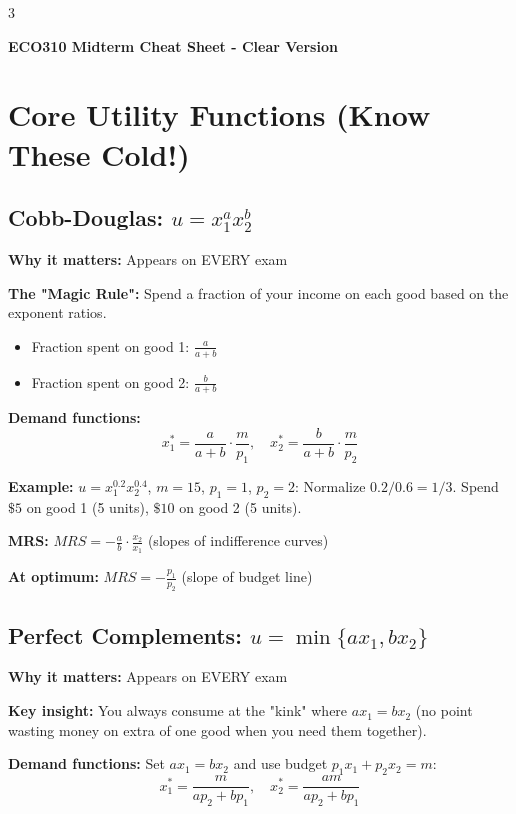 \documentclass[10pt,landscape]{article}
\begin{document}
\begin{multicols}{3}
\small

\begin{center}
\textbf{\large ECO310 Midterm Cheat Sheet - Clear Version}
\end{center}

\section{Core Utility Functions (Know These Cold!)}

\subsection{Cobb-Douglas: $u = x_1^a x_2^b$}
\textbf{Why it matters:} Appears on EVERY exam

\textbf{The "Magic Rule":} Spend a fraction of your income on each good based on the exponent ratios.
\begin{itemize}[leftmargin=*,noitemsep,topsep=0pt]
\item Fraction spent on good 1: $\frac{a}{a+b}$
\item Fraction spent on good 2: $\frac{b}{a+b}$
\end{itemize}

\textbf{Demand functions:}
$$x_1^* = \frac{a}{a+b} \cdot \frac{m}{p_1}, \quad x_2^* = \frac{b}{a+b} \cdot \frac{m}{p_2}$$

\textbf{Example:} $u = x_1^{0.2} x_2^{0.4}$, $m=15$, $p_1=1$, $p_2=2$: Normalize $0.2/0.6 = 1/3$. Spend $\$5$ on good 1 (5 units), $\$10$ on good 2 (5 units).

\textbf{MRS:} $MRS = -\frac{a}{b} \cdot \frac{x_2}{x_1}$ (slopes of indifference curves)

\textbf{At optimum:} $MRS = -\frac{p_1}{p_2}$ (slope of budget line)

\subsection{Perfect Complements: $u = \min\{ax_1, bx_2\}$}
\textbf{Why it matters:} Appears on EVERY exam

\textbf{Key insight:} You always consume at the "kink" where $ax_1 = bx_2$ (no point wasting money on extra of one good when you need them together).

\textbf{Demand functions:} Set $ax_1 = bx_2$ and use budget $p_1x_1 + p_2x_2 = m$:
$$x_1^* = \frac{m}{ap_2 + bp_1}, \quad x_2^* = \frac{am}{ap_2 + bp_1}$$


\end{multicols}
\end{document}
